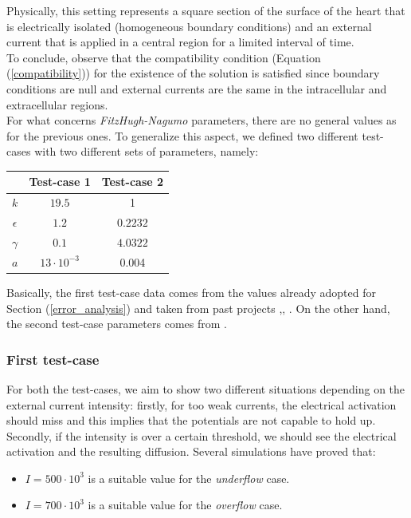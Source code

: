 \documentclass[a4paper,11pt]{article}
\begin{document}
\noindent Physically, this setting represents a square section of the surface of the heart that is electrically isolated (homogeneous boundary conditions) and an external current that is applied in a central region for a limited interval of time. \\
To conclude, observe that the compatibility condition (Equation (\ref{compatibility})) for the existence of the solution is satisfied since boundary conditions are null and external currents are the same in the intracellular and extracellular regions. \\

\noindent For what concerns \emph{FitzHugh-Nagumo} parameters, there are no general values as for the previous ones. To generalize this aspect, we defined two different test-cases with two different sets of parameters, namely:

\begin{center}
	\begin{tabular}{|c|c|c|} 
		\hline 
		 & Test-case 1 & Test-case 2 \\
		\hline \hline
		$k$ & $19.5 $ & 1 \\
		\hline
		$\epsilon$ & $1.2$ & $0.2232$ \\ 
		\hline
		$\gamma$ & $0.1$ & $4.0322$ \\
		\hline
		$a$ & $13\cdot 10^{-3}$ & 0.004 \\
		\hline
	\end{tabular}
\end{center}

\vspace{4mm}
\noindent Basically, the first test-case data comes from the values already adopted for Section (\ref{error_analysis}) and taken from past projects \cite{bagnara},\cite{andreotti}, \cite{marta}. On the other hand, the second test-case parameters comes from \cite{mauricio}.

\subsubsection{First test-case}
For both the test-cases, we aim to show two different situations depending on the external current intensity: firstly, for too weak currents, the electrical activation should miss and this implies that the potentials are not capable to hold up. Secondly, if the intensity is over a certain threshold, we should see the electrical activation and the resulting diffusion. Several simulations have proved that:
\begin{itemize}
	\item $I = 500 \cdot 10^3 $ is a suitable value for the \emph{underflow} case.
	\item $I = 700 \cdot 10^3 $ is a suitable value for the \emph{overflow} case.
\end{itemize}
\end{document}
